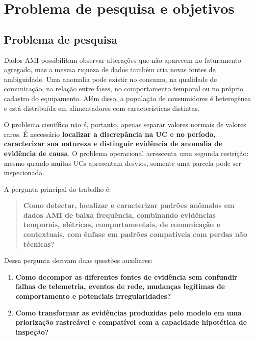 \chapter{Problema de pesquisa e objetivos}\label{problema-de-pesquisa-e-objetivos}

\section{Problema de pesquisa}\label{problema-de-pesquisa}

Dados AMI possibilitam observar alterações que não aparecem no faturamento agregado, mas a mesma riqueza de dados também cria novas fontes de ambiguidade. Uma anomalia pode existir no consumo, na qualidade de comunicação, na relação entre fases, no comportamento temporal ou no próprio cadastro do equipamento. Além disso, a população de consumidores é heterogênea e está distribuída em alimentadores com características distintas.

O problema científico não é, portanto, apenas separar valores normais de valores raros. É necessário \textbf{localizar a discrepância na UC e no período, caracterizar sua natureza e distinguir evidência de anomalia de evidência de causa}. O problema operacional acrescenta uma segunda restrição: mesmo quando muitas UCs apresentam desvios, somente uma parcela pode ser inspecionada.

A pergunta principal do trabalho é:

\begin{quote}
\textbf{Como detectar, localizar e caracterizar padrões anômalos em dados AMI de baixa frequência, combinando evidências temporais, elétricas, comportamentais, de comunicação e contextuais, com ênfase em padrões compatíveis com perdas não técnicas?}
\end{quote}

Dessa pergunta derivam duas questões auxiliares:

\begin{enumerate}
\def\labelenumi{\arabic{enumi}.}
\item
  \textbf{Como decompor as diferentes fontes de evidência sem confundir falhas de telemetria, eventos de rede, mudanças legítimas de comportamento e potenciais irregularidades?}
\item
  \textbf{Como transformar as evidências produzidas pelo modelo em uma priorização rastreável e compatível com a capacidade hipotética de inspeção?}
\end{enumerate}

